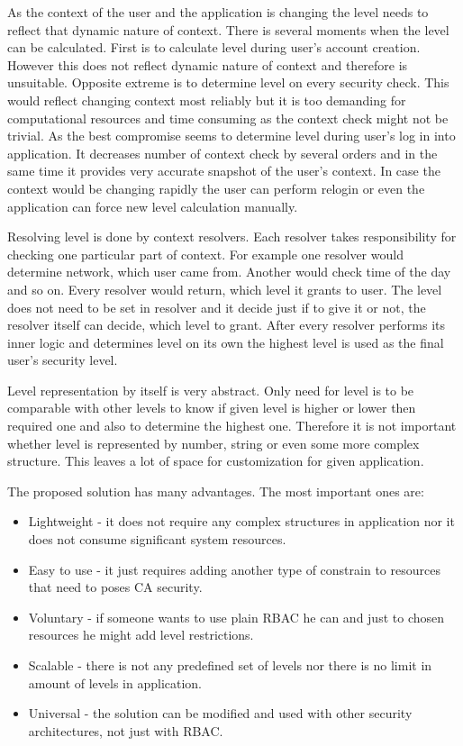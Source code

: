 \documentclass{poster15}
\begin{document}
As the context of the user and the application is changing the level needs to reflect that dynamic nature of context. There is several moments when the level can be calculated. First is to calculate level during user's account creation. However this does not reflect dynamic nature of context and therefore is unsuitable. Opposite extreme is to determine level on every security check. This would reflect changing context most reliably but it is too demanding for computational resources and time consuming as the context check might not be trivial. As the best compromise seems to determine level during user's log in into application. It decreases number of context check by several orders and in the same time it provides very accurate snapshot of the user's context. In case the context would be changing rapidly the user can perform relogin or even the application can force new level calculation manually.

Resolving level is done by context resolvers. Each resolver takes responsibility for checking one particular part of context. For example one resolver would determine network, which user came from. Another would check time of the day and so on. Every resolver would return, which level it grants to user. The level does not need to be set in resolver and it decide just if to give it or not, the resolver itself can decide, which level to grant. After every resolver performs its inner logic and determines level on its own the highest level is used as the final user's security level.

Level representation by itself is very abstract. Only need for level is to be comparable with other levels to know if given level is higher or lower then required one and also to determine the highest one. Therefore it is not important whether level is represented by number, string or even some more complex structure. This leaves a lot of space for customization for given application.

The proposed solution has many advantages. The most important ones are:

\begin{itemize}
  \item Lightweight - it does not require any complex structures in application nor it does not consume significant system resources.
  
  \item Easy to use - it just requires adding another type of constrain to resources that need to poses CA security.
  
  \item Voluntary - if someone wants to use plain RBAC he can and just to chosen resources he might add level restrictions. 
  
  \item Scalable - there is not any predefined set of levels nor there is no limit in amount of levels in application.
  
  \item Universal - the solution can be modified and used with other security architectures, not just with RBAC.
\end{itemize}
\end{document}
